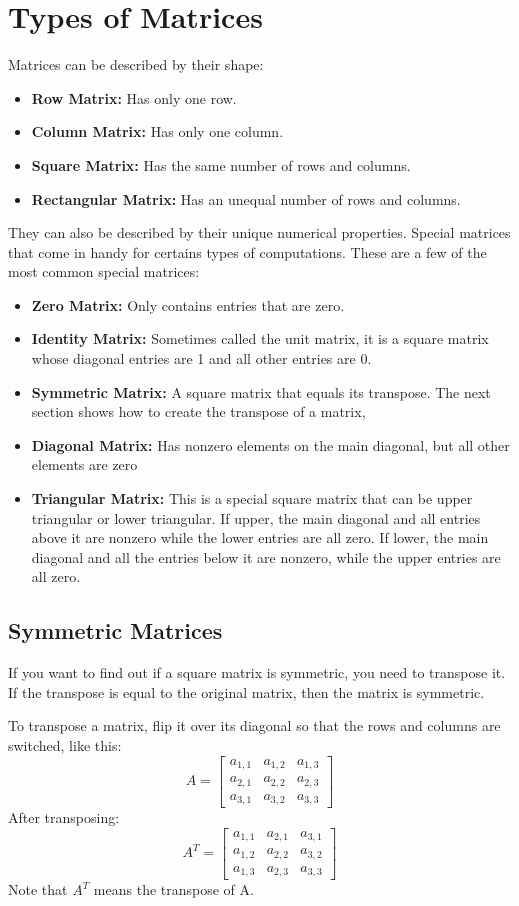 \section{Types of Matrices}
Matrices can be described by their shape:
\begin{itemize}
	\item \textbf{Row Matrix:} Has only one row.
	\item \textbf{Column Matrix:} Has only one column.
	\item \textbf{Square Matrix:} Has the same number of rows and columns.
	\item \textbf{Rectangular Matrix:} Has an unequal number of rows and columns.
\end{itemize}
They can also be described by their unique numerical properties. Special matrices that come in handy for certains types of computations. These are a few of the most common special matrices:
\begin{itemize}
	\item \textbf{Zero Matrix:} Only contains entries that are zero.
	\item \textbf{Identity Matrix:} Sometimes called the unit matrix, it is a square matrix whose diagonal entries are 1 and all other entries are 0.
	\item \textbf{Symmetric Matrix:} A square matrix that equals its transpose. The next section shows how to create the transpose of a matrix,
	\item \textbf{Diagonal Matrix:} Has nonzero elements on the main diagonal, but all other elements are zero
	\item \textbf{Triangular Matrix:} This is a special square matrix that can be upper triangular or lower triangular. If upper, the main diagonal and all entries above it are nonzero while the lower entries are all zero. If lower, the main diagonal and all the entries below it are nonzero, while the upper entries are all zero. 
\end{itemize}

\subsection{Symmetric Matrices}
If you want to find out if a square matrix is symmetric, you need to transpose it. If the transpose is equal to the original matrix, then the matrix is symmetric.

To transpose a matrix, flip it over its diagonal so that the rows and columns are switched, like this:
$$
A = \begin{bmatrix}
a_{1,1} & a_{1,2} & a_{1,3} \\
a_{2,1} & a_{2,2} & a_{2,3} \\
a_{3,1} & a_{3,2} & a_{3,3}
\end{bmatrix}
$$
After transposing:
$$
A^T = \begin{bmatrix}
a_{1,1} & a_{2,1} & a_{3,1} \\
a_{1,2} & a_{2,2} & a_{3,2} \\
a_{1,3} & a_{2,3} & a_{3,3}
\end{bmatrix}
$$
Note that $A^T$ means the transpose of A. 

